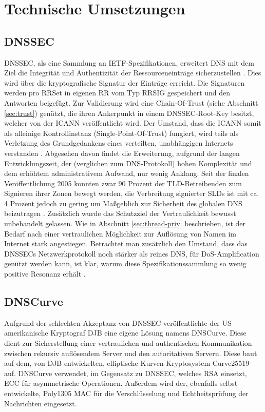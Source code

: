 \chapter{Technische Umsetzungen}
\label{chap:technologies}

\section{DNSSEC}
\label{sec:tec-dnssec}
DNSSEC, als eine Sammlung an IETF-Spezifikationen, erweitert DNS mit dem Ziel die Integrität und Authentizität der Ressourceneinträge sicherzustellen \cite{Arends2005}. Dies wird über die kryptografische Signatur der Einträge erreicht. Die Signaturen werden pro RRSet in eigenen RR vom Typ RRSIG gespeichert und den Antworten beigefügt. Zur Validierung wird eine Chain-Of-Trust (siehe Abschnitt \ref{sec:trust}) genützt, die ihren Ankerpunkt in einem \ac{DNSSEC}-Root-Key besitzt, welcher von der ICANN veröffentlicht wird. Der Umstand, dass die ICANN somit als alleinige Kontrollinstanz (Single-Point-Of-Trust) fungiert, wird teils als Verletzung des Grundgedankens eines verteilten, unabhängigen Internets verstanden \cite{Finch2014}.
Abgesehen davon findet die Erweiterung, aufgrund der langen Entwicklungszeit, der (verglichen zum DNS-Protokoll) hohen Komplexität und dem erhöhtem administrativem Aufwand, nur wenig Anklang. Seit der finalen Veröffentlichung 2005 konnten zwar 90 Prozent der TLD-Betreibenden zum Signieren ihrer Zonen bewegt werden, die Verbreitung signierter SLDs ist mit ca. 4 Prozent jedoch zu gering um Maßgeblich zur Sicherheit des globalen DNS beizutragen \cite{DCCommunications2018}. Zusätzlich wurde das Schutzziel der Vertraulichkeit bewusst unbehandelt gelassen. Wie in Abschnitt \ref{sec:thread-priv} beschrieben, ist der Bedarf nach einer vertraulichen Möglichkeit zur Auflösung von Namen im Internet stark angestiegen. Betrachtet man zusätzlich den Umstand, dass das \ac{DNSSEC}s Netzwerkprotokoll noch stärker als reines DNS, für \ac{DoS}-Amplification genützt werden kann, ist klar, warum diese Spezifikationssammlung so wenig positive Resonanz erhält \cite{Antic2014}.

\section{DNSCurve}
\label{sec:tec-dnscurve}
Aufgrund der schlechten Akzeptanz von \ac{DNSSEC} veröffentlichte der US-amerikanische Kryptograf \ac{DJB} eine eigene Lösung namens DNSCurve. Diese dient zur Sicherstellung einer vertraulichen und authentischen Kommunikation zwischen rekursiv auflösendem Server und den autoritativen Servern. Diese baut auf dem, von \ac{DJB} entwickelten, elliptische Kurven-Kryptosystem Curve25519 auf. DNSCurve verwendet, im Gegensatz zu \ac{DNSSEC}, welches RSA einsetzt, \ac{ECC} für asymmetrische Operationen. Außerdem wird der, ebenfalls selbst entwickelte, Poly1305 \ac{MAC} für die Verschlüsselung und Echtheitsprüfung der Nachrichten eingesetzt. 


